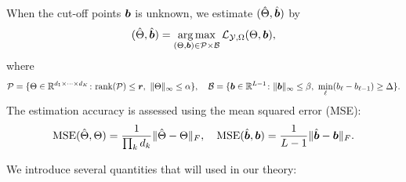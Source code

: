 \documentclass[11pt]{article}
\theoremstyle{plain}
\theoremstyle{definition}
\begin{document}
When the cut-off points $\bm{b}$ is unknown, we estimate $(\hat \Theta,\hat {\bm{b}})$ by
\begin{equation}\label{eq:joint}
(\hat \Theta,\hat {\bm{b}})=\operatorname*{arg\,max}_{(\Theta,\bm{b})\in\mathcal{P}\times \mathcal{B}}\mathcal{L}_{\mathcal{Y},\Omega}(\Theta,\bm{b}),
\end{equation}
where
\[
\tP=\{\Theta\in\mathbb{R}^{d_1\times \cdots\times d_K}\colon \text{rank}(\tP)\leq \mr,\ \mnormSize{}{\Theta}\leq \alpha\}, \quad \tB=\{\mb\in\mathbb{R}^{L-1}\colon \mnormSize{}{\mb}\leq \beta,\ \min_{\ell}(b_\ell-b_{\ell-1}) \geq \Delta\}.
\]
The estimation accuracy is assessed using the mean squared error (MSE):
\[
\text{MSE}(\hat \Theta,\Theta)={1\over \prod_k d_k}\lVert\hat \Theta-\Theta\rVert_F,\quad \text{MSE}(\hat {\bm{b}},\bm{b})={1\over L-1}\lVert\hat {\bm{b}}-\bm{b}\rVert_F.
\]

We introduce several quantities that will used in our theory:
\end{document}
